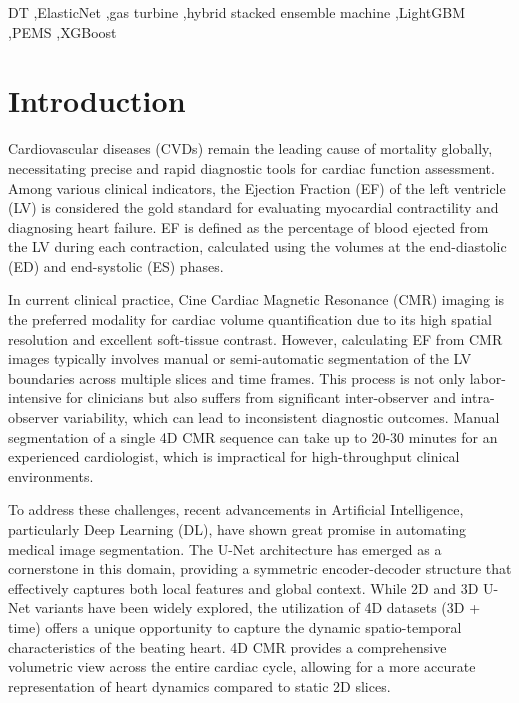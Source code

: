 \documentclass[final,3p,times,twocolumn]{elsarticle}
\begin{document}
\begin{frontmatter}
\begin{keyword}
DT \sep ElasticNet \sep gas turbine \sep hybrid stacked ensemble machine \sep LightGBM \sep PEMS \sep XGBoost 
\end{keyword}

\end{frontmatter}


\section{Introduction}\label{sec1}
Cardiovascular diseases (CVDs) remain the leading cause of mortality globally, necessitating precise and rapid diagnostic tools for cardiac function assessment. Among various clinical indicators, the Ejection Fraction (EF) of the left ventricle (LV) is considered the gold standard for evaluating myocardial contractility and diagnosing heart failure. EF is defined as the percentage of blood ejected from the LV during each contraction, calculated using the volumes at the end-diastolic (ED) and end-systolic (ES) phases.

In current clinical practice, Cine Cardiac Magnetic Resonance (CMR) imaging is the preferred modality for cardiac volume quantification due to its high spatial resolution and excellent soft-tissue contrast. However, calculating EF from CMR images typically involves manual or semi-automatic segmentation of the LV boundaries across multiple slices and time frames. This process is not only labor-intensive for clinicians but also suffers from significant inter-observer and intra-observer variability, which can lead to inconsistent diagnostic outcomes. Manual segmentation of a single 4D CMR sequence can take up to 20-30 minutes for an experienced cardiologist, which is impractical for high-throughput clinical environments.

To address these challenges, recent advancements in Artificial Intelligence, particularly Deep Learning (DL), have shown great promise in automating medical image segmentation. The U-Net architecture has emerged as a cornerstone in this domain, providing a symmetric encoder-decoder structure that effectively captures both local features and global context. While 2D and 3D U-Net variants have been widely explored, the utilization of 4D datasets (3D + time) offers a unique opportunity to capture the dynamic spatio-temporal characteristics of the beating heart. 4D CMR provides a comprehensive volumetric view across the entire cardiac cycle, allowing for a more accurate representation of heart dynamics compared to static 2D slices.
\end{document}
